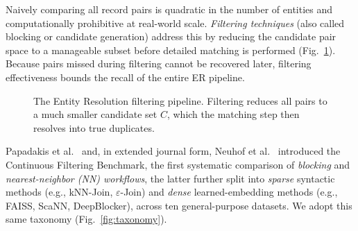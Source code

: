 \documentclass[runningheads]{llncs}
\begin{document}
Naively comparing all record pairs is quadratic in the number of entities and computationally prohibitive at real-world scale. \textit{Filtering techniques} (also called blocking or candidate generation) address this by reducing the candidate pair space to a manageable subset before detailed matching is performed (Fig.~\ref{fig:er-pipeline}). Because pairs missed during filtering cannot be recovered later, filtering effectiveness bounds the recall of the entire ER pipeline.

\begin{figure}[!ht]
\centering
{}
\caption{The Entity Resolution filtering pipeline. Filtering reduces all pairs to a much
smaller candidate set $C$, which the matching step then resolves into true duplicates.}
\label{fig:er-pipeline}
\end{figure}

Papadakis et al.~\cite{papadakis2023benchmarking} and, in extended journal form, Neuhof et al.~\cite{neuhof2024open} introduced the Continuous Filtering Benchmark, the first systematic comparison of \textit{blocking} and \textit{nearest-neighbor (NN) workflows}, the latter further split into \textit{sparse} syntactic methods (e.g., kNN-Join, $\varepsilon$-Join) and \textit{dense} learned-embedding methods (e.g., FAISS, ScaNN, DeepBlocker), across ten general-purpose datasets. We adopt this same taxonomy (Fig.~\ref{fig:taxonomy}).
\end{document}
